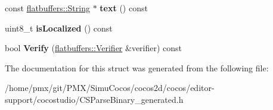 \begin{DoxyCompactItemize}
const \hyperlink{structflatbuffers_1_1String}{flatbuffers\+::\+String} $\ast$ {\bfseries text} () const
\item 
\mbox{\label{structflatbuffers_1_1TextBMFontOptions_adfb9884467d516c2232db8f01687ca93}} 
uint8\+\_\+t {\bfseries is\+Localized} () const
\item 
\mbox{\label{structflatbuffers_1_1TextBMFontOptions_a55611bde0126b3aad0618ac09e596886}} 
bool {\bfseries Verify} (\hyperlink{classflatbuffers_1_1Verifier}{flatbuffers\+::\+Verifier} \&verifier) const
\end{DoxyCompactItemize}


The documentation for this struct was generated from the following file\+:\begin{DoxyCompactItemize}
\item 
/home/pmx/git/\+P\+M\+X/\+Simu\+Cocos/cocos2d/cocos/editor-\/support/cocostudio/C\+S\+Parse\+Binary\+\_\+generated.\+h\end{DoxyCompactItemize}
